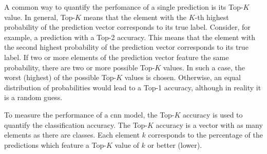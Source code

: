 A common way to quantify the perfomance of a single prediction is its Top-$K$ value.
In general, Top-$K$ means that the element with the $K$-th highest probability of the prediction vector corresponds to its true label.
Consider, for example, a prediction with a Top-2 accuracy.
This means that the element with the second highest probability of the prediction vector corresponds to its true label.
If two or more elements of the prediction vector feature the same probability, there are two or more possible Top-$K$ values.
In such a case, the worst (highest) of the possible Top-$K$ values is chosen.
Otherwise, an equal distribution of probabilities would lead to a Top-1 accuracy, although in reality it is a random guess.

To measure the performance of a \acrshort{cnn} model, the Top-$K$ accuracy is used to quantify the classification accuracy.
The Top-$K$ accuracy is a vector with as many elements as there are classes.
Each element $k$ corresponds to the percentage of the predictions which feature a Top-$K$ value of $k$ or better (lower).

